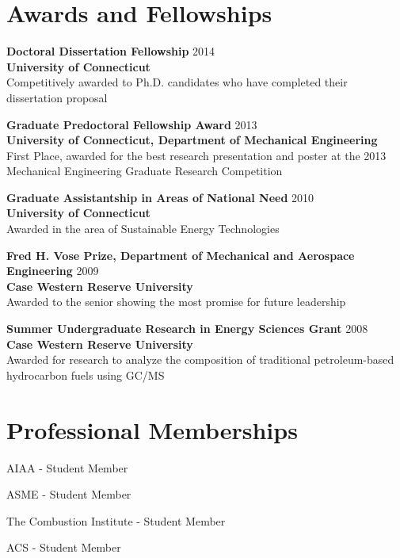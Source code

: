 \vspace{0.5em}

\section{Awards and Fellowships}

\begin{lonelist}
   \item[] \textbf{Doctoral Dissertation Fellowship} \hfill 2014\\
           \textbf{University of Connecticut}\\
           Competitively awarded to Ph.D. candidates who have completed
           their dissertation proposal
   \item[] \textbf{Graduate Predoctoral Fellowship Award} \hfill 2013\\
           \textbf{University of Connecticut, Department of Mechanical
                   Engineering}\\
            First Place, awarded for the best research presentation and
            poster at the 2013 Mechanical Engineering Graduate Research
            Competition
   \item[] \textbf{Graduate Assistantship in Areas of National
                   Need} \hfill 2010\\
           \textbf{University of Connecticut}\\
            Awarded in the area of Sustainable Energy Technologies

   \item[] \textbf{Fred H. Vose Prize, Department of Mechanical and
                   Aerospace Engineering} \hfill 2009\\
           \textbf{Case Western Reserve University}\\
           Awarded to the senior showing the most promise for future
           leadership

   \item[] \textbf{Summer Undergraduate Research in Energy Sciences
                   Grant} \hfill 2008\\
           \textbf{Case Western Reserve University}\\
           Awarded for research to analyze the composition of
           traditional petroleum-based hydrocarbon fuels using GC/MS
\end{lonelist}

\section{Professional Memberships}
AIAA - Student Member

ASME - Student Member

The Combustion Institute - Student Member

ACS - Student Member



